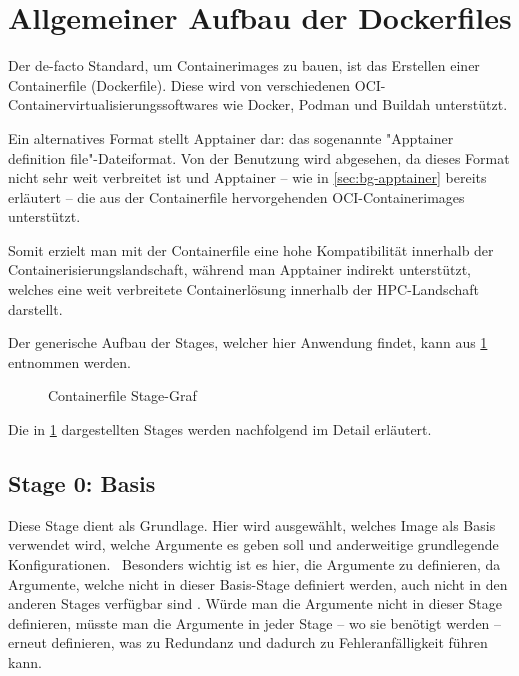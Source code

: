 \section{Allgemeiner Aufbau der Dockerfiles} \label{sec:allgemeiner-aufbau-der-dockerfiles}

Der de-facto Standard, um Containerimages zu bauen, ist das Erstellen einer Containerfile (Dockerfile). Diese wird von verschiedenen OCI-Containervirtualisierungssoftwares wie Docker, Podman und Buildah unterstützt. 

Ein alternatives Format stellt Apptainer dar: das sogenannte "Apptainer definition file"-Dateiformat. Von der Benutzung wird abgesehen, da dieses Format nicht sehr weit verbreitet ist und Apptainer – wie in \cref{sec:bg-apptainer} bereits erläutert – die aus der Containerfile hervorgehenden OCI-Containerimages unterstützt. 

Somit erzielt man mit der Containerfile eine hohe Kompatibilität innerhalb der Containerisierungslandschaft, während man Apptainer indirekt unterstützt, welches eine weit verbreitete Containerlösung innerhalb der HPC-Landschaft darstellt.

Der generische Aufbau der Stages, welcher hier Anwendung findet, kann aus \cref{fig:containerfile-stage-graph} entnommen werden.

\begin{figure}[!htbp]
    \centering
    
    \caption{Containerfile Stage-Graf}
    \label{fig:containerfile-stage-graph}
\end{figure}

\FloatBarrier

Die in \cref{fig:containerfile-stage-graph} dargestellten Stages werden nachfolgend im Detail erläutert.

\subsection{Stage 0: Basis} \label{sec:generic-stage-0}

Diese Stage dient als Grundlage. Hier wird ausgewählt, welches Image als Basis verwendet wird, welche Argumente es geben soll und anderweitige grundlegende Konfigurationen. \
Besonders wichtig ist es hier, die Argumente zu definieren, da Argumente, welche nicht in dieser Basis-Stage definiert werden, auch nicht in den anderen Stages verfügbar sind \cite[Vgl. "Understand how ARG and FROM interact"]{DockerfileReference0100}. Würde man die Argumente nicht in dieser Stage definieren, müsste man die Argumente in jeder Stage – wo sie benötigt werden – erneut definieren, was zu Redundanz und dadurch zu Fehleranfälligkeit führen kann.

